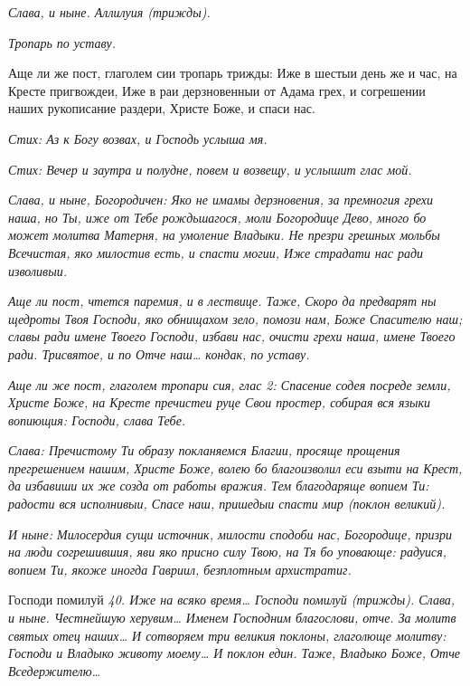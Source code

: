  \itshape Слава, и ныне\normalfont{}. Аллилуия \itshape (трижды)\normalfont{}.


 \itshape Тропарь по уставу.\normalfont{}


   Аще ли же пост, глаголем сии тропарь трижды: Иже в шестыи день же и
час, на Кресте пригвождеи, Иже в раи дерзновенныи от Адама грех,
и согрешении наших рукописание раздери, Христе Боже, и спаси
нас.


 \itshape Стих:\normalfont{} Аз к Богу возвах, и Господь услыша мя.



 \itshape Стих:\normalfont{} Вечер и заутра и полудне, повем и возвещу, и услышит глас
мой.


 \itshape Слава, и ныне\normalfont{}, \itshape Богородичен:\normalfont{} Яко не имамы дерзновения, за премногия
грехи наша, но Ты, иже от Тебе рождьшагося, моли Богородице Дево, много
бо может молитва Матерня, на умоление Владыки. Не презри грешных
мольбы Всечистая, яко милостив есть, и спасти могии, Иже страдати нас
ради изволивыи.


 \itshape Аще ли пост, чтется паремия, и в лествице. Таже,\normalfont{} Скоро да предварят ны
щедроты Твоя Господи, яко обнищахом зело, помози нам, Боже Спасителю
наш; славы ради имене Твоего Господи, избави нас, очисти грехи
наша, имене Твоего ради. \itshape Трисвятое\normalfont{}, \itshape и по\normalfont{} Отче наш… \itshape кондак, по
уставу.\normalfont{}


 \itshape Аще ли же пост, глаголем тропари сия, глас 2:\normalfont{} Спасение содея посреде
земли, Христе Боже, на Кресте пречистеи руце Свои простер, собирая вся
языки вопиющия: Господи, слава Тебе.


 \itshape Слава:\normalfont{} Пречистому Ти образу покланяемся Благии, просяще прощения
прегрешением нашим, Христе Боже, волею бо благоизволил еси взыти на
Крест, да избавиши их же созда от работы вражия. Тем благодаряще вопием
Ти: радости вся исполнивыи, Спасе наш, пришедыи спасти мир \itshape (поклон
великий)\normalfont{}.


 \itshape И ныне:\normalfont{} Милосердия сущи источник, милости сподоби нас, Богородице,
призри на люди согрешившия, яви яко присно силу Твою, на Тя бо
уповающе: радуися, вопием Ти, якоже иногда Гавриил, безплотным
архистратиг.


   Господи помилуй \itshape 40\normalfont{}. Иже на всяко время… Господи помилуй \itshape (трижды)\normalfont{}.
\itshape Слава, и ныне\normalfont{}. Честнейшую херувим… Именем Господним благослови, отче.
За молитв святых отец наших… \itshape И сотворяем три великия поклоны,
глаголюще молитву:\normalfont{} Господи и Владыко животу моему… \itshape И поклон един.
Таже,\normalfont{} Владыко Боже, Отче Вседержителю…



